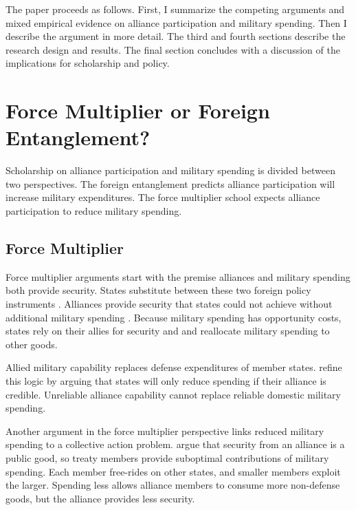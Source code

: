 \documentclass[12pt]{article}
\begin{document}
The paper proceeds as follows. 
First, I summarize the competing arguments and mixed empirical evidence on alliance participation and military spending. 
Then I describe the argument in more detail. 
The third and fourth sections describe the research design and results. 
The final section concludes with a discussion of the implications for scholarship and policy.  


\section{Force Multiplier or Foreign Entanglement?}


Scholarship on alliance participation and military spending is divided between two perspectives. 
The foreign entanglement predicts alliance participation will increase military expenditures.
The force multiplier school expects alliance participation to reduce military spending. 


\subsection{Force Multiplier} 


Force multiplier arguments start with the premise alliances and military spending both provide security.
States substitute between these two foreign policy instruments \citep{MostStarr1989}.  
Alliances provide security that states could not achieve without additional military spending \citep{Morrow1993, Conybeare1994}. 
Because military spending has opportunity costs, states rely on their allies for security and and reallocate military spending to other goods. 


Allied military capability replaces defense expenditures of member states. 
\citet{DigiuseppePoast2016} refine this logic by arguing that states will only reduce spending if their alliance is credible. 
Unreliable alliance capability cannot replace reliable domestic military spending. 


Another argument in the force multiplier perspective links reduced military spending to a collective action problem. 
\citet{OlsonZeckhauser1966} argue that security from an alliance is a public good, so treaty members provide suboptimal contributions of military spending. 
Each member free-rides on other states, and smaller members exploit the larger. 
Spending less allows alliance members to consume more non-defense goods, but the alliance provides less security. 
\end{document}
